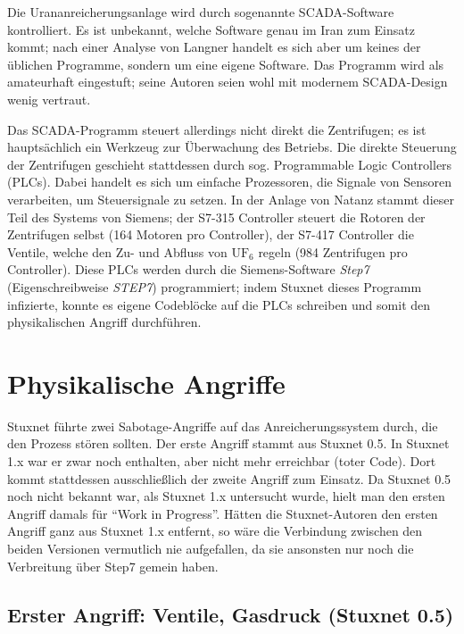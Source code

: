 \documentclass[a4paper]{article}
\begin{document}
Die Urananreicherungsanlage wird durch sogenannte SCADA-Software kontrolliert.
Es ist unbekannt, welche Software genau im Iran zum Einsatz kommt;
nach einer Analyse von Langner\cite{tkac} handelt es sich aber um keines der üblichen Programme, %
sondern um eine eigene Software.
Das Programm wird als amateurhaft eingestuft;
seine Autoren seien wohl mit modernem SCADA-Design wenig vertraut. %

Das SCADA-Programm steuert allerdings nicht direkt die Zentrifugen;
es ist hauptsächlich ein Werkzeug zur Überwachung des Betriebs. %
Die direkte Steuerung der Zentrifugen geschieht stattdessen durch sog. Programmable Logic Controllers (PLCs).
Dabei handelt es sich um einfache Prozessoren, die Signale von Sensoren verarbeiten,
um Steuersignale zu setzen.
In der Anlage von Natanz stammt dieser Teil des Systems von Siemens;
der S7-315 Controller steuert die Rotoren der Zentrifugen selbst (164 Motoren pro Controller), %
der S7-417 Controller die Ventile, welche den Zu- und Abfluss von $\mathrm{UF}_6$ regeln (984 Zentrifugen pro Controller).
Diese PLCs werden durch die Siemens-Software \emph{Step7} (Eigenschreibweise \emph{STEP7}) programmiert;
indem Stuxnet dieses Programm infizierte, konnte es eigene Codeblöcke auf die PLCs schreiben
und somit den physikalischen Angriff durchführen.

\section{Physikalische Angriffe}

Stuxnet führte zwei Sabotage-Angriffe auf das Anreicherungssystem durch, die den Prozess stören sollten.
Der erste Angriff stammt aus Stuxnet 0.5.
In Stuxnet 1.x war er zwar noch enthalten, aber nicht mehr erreichbar (toter Code).
Dort kommt stattdessen ausschließlich der zweite Angriff zum Einsatz.
Da Stuxnet 0.5 noch nicht bekannt war, als Stuxnet 1.x untersucht wurde,
hielt man den ersten Angriff damals für ``Work in Progress''.\cite{dossier} %
Hätten die Stuxnet-Autoren den ersten Angriff ganz aus Stuxnet 1.x entfernt,
so wäre die Verbindung zwischen den beiden Versionen vermutlich nie aufgefallen,
da sie ansonsten nur noch die Verbreitung über Step7 gemein haben.\cite{05} %

\subsection{Erster Angriff: Ventile, Gasdruck (Stuxnet 0.5)}
\end{document}
